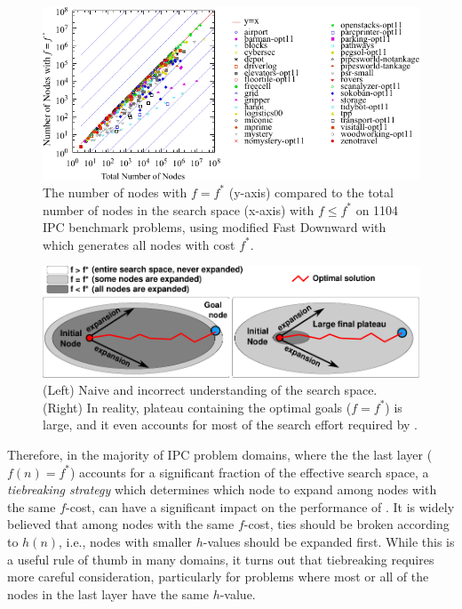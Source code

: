 \begin{figure}[htbp]
  \centering
  \includegraphics{tables/aaai16-frontier/aaai16prelim3/lmcut_frontier_noh-front.pdf}
 \caption{
 The number of nodes with $f=f^*$ (y-axis) compared to the
 total number of nodes in the search space (x-axis) with $f\leq f^*$ on 1104 IPC benchmark problems,
  using modified Fast Downward with \lmcut which 
  generates all nodes with cost $f^*$.
  }
 \label{fig:plateau-noh}
\end{figure}

\begin{figure}[htbp]
  \centering
  \includegraphics{img/astar/plateau-0.pdf}
 \caption{(Left) Naive and incorrect understanding of the search space. (Right) In reality, plateau containing the optimal goals ($f=f^*$) is large, and it even accounts for most of the search effort required by \astar.
  }
 \label{fig:plateau-0}
\end{figure}

Therefore, in the majority of IPC problem domains, where the 
the last layer ($f(n)=f^*$) accounts for a significant fraction of the effective search space, a
\emph{tiebreaking strategy} which determines which node to 
 expand among nodes with the same $f$-cost,
can have a significant impact on the
performance of \astar. 
It is widely believed that among nodes with the same $f$-cost,
ties should be broken according to $h(n)$, i.e.,
nodes with smaller $h$-values should be expanded first.  While this is a
useful rule of thumb in many domains, it turns out that tiebreaking
requires more careful consideration, particularly for problems where
most or all of the nodes in the last layer have the same $h$-value.

